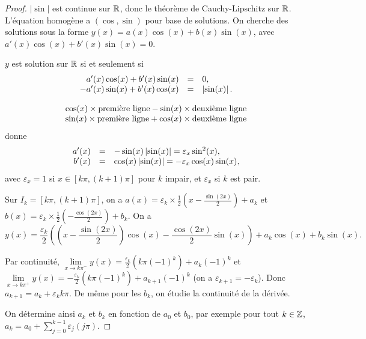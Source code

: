 \documentclass[12pt]{article}
\begin{document}
\begin{proof}
	$\left\lvert\sin\right\rvert$ est continue sur $\mathbb{R}$, donc le théorème de Cauchy-Lipschitz sur $\mathbb{R}$. L'équation homogène a $(\cos,\sin)$ pour base de solutions. On cherche des solutions sous la forme $y(x)=a(x)\cos(x)+b(x)\sin(x)$, avec $a'(x)\cos(x)+b'(x)\sin(x)=0$.

	$y$ est solution sur $\mathbb{R}$ si et seulement si 
	\begin{equation*}
		\begin{array}[]{rcl}
			a'(x)\cos(x)+b'(x)\sin(x)&=&0,\\
			-a'(x)\sin(x)+b'(x)\cos(x)&=&\left\lvert\sin(x)\right\rvert.
		\end{array}
	\end{equation*}
	
	
	\begin{equation*}
		\begin{array}[]{l}
			\cos(x)\times\text{première ligne}-\sin(x)\times\text{deuxième ligne}\\
			\sin(x)\times\text{première ligne}+\cos(x)\times\text{deuxième ligne}
		\end{array}
	\end{equation*}
	donne 
	\begin{equation*}
		\begin{array}[]{rcl}
			a'(x) &=& -\sin(x)\left\lvert\sin(x)\right\rvert=\varepsilon_{x}\sin^{2}(x),\\
			b'(x) &=& \cos(x)\left\lvert\sin(x)\right\rvert=-\varepsilon_{x}\cos(x)\sin(x),
		\end{array}
	\end{equation*}
	avec $\varepsilon_{x}=1$ si $x\in[k\pi,(k+1)\pi]$ pour $k$ impair, et $\varepsilon_{x}$ si $k$ est pair.

	Sur $I_k=[k\pi,(k+1)\pi]$, on a $a(x)=\varepsilon_k\times\frac{1}{2}\left(x-\frac{\sin(2x)}{2}\right)+a_k$ et $b(x)=\varepsilon_{k}\times\frac{1}{2}\left(-\frac{\cos(2x)}{2}\right)+b_k$. On a 
	\begin{equation*}
		y(x)=\frac{\varepsilon_k}{2}\left(\left(x-\frac{\sin(2x)}{2}\right)\cos(x)-\frac{\cos(2x)}{2}\sin(x)\right)+a_k\cos(x)+b_k\sin(x).
	\end{equation*}

	Par continuité, $\lim\limits_{x\to k\pi^{-}}y(x)=\frac{\varepsilon_{k}}{2}\left(k\pi(-1)^{k}\right)+a_k(-1)^{k}$ et $\lim\limits_{x\to k\pi^{+}}y(x)=-\frac{\varepsilon_k}{2}(k\pi(-1)^{k})+a_{k+1}(-1)^{k}$ (on a $\varepsilon_{k+1}=-\varepsilon_k$). Donc $a_{k+1}=a_{k}+\varepsilon_{k}k\pi$. De même pour les $b_k$, on étudie la continuité de la dérivée.

	On détermine ainsi $a_k$ et $b_k$ en fonction de $a_0$ et $b_0$, par exemple pour tout $k\in\mathbb{Z}$, $a_k=a_0+\sum_{j=0}^{k-1}\varepsilon_j	(j\pi)$.
\end{proof}
\end{document}
